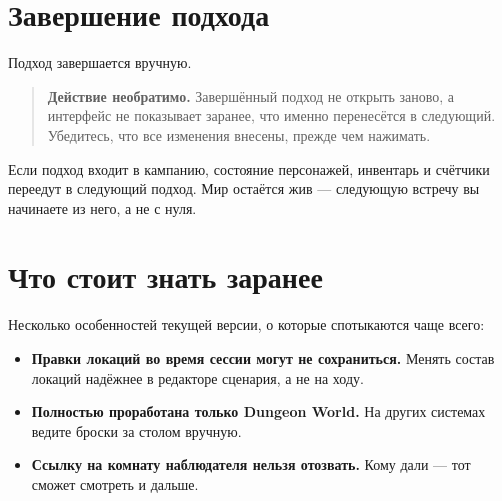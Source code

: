 \section{Завершение подхода}
\label{sec:master:finish}

Подход завершается вручную.

\begin{quote}
\small
\textbf{Действие необратимо.} Завершённый подход не открыть заново, а интерфейс не показывает заранее, что именно перенесётся в следующий. Убедитесь, что все изменения внесены, прежде чем нажимать.
\end{quote}

Если подход входит в кампанию, состояние персонажей, инвентарь и счётчики переедут в следующий подход. Мир остаётся жив --- следующую встречу вы начинаете из него, а не с нуля.

\section{Что стоит знать заранее}
\label{sec:master:caveats}

Несколько особенностей текущей версии, о которые спотыкаются чаще всего:

\begin{itemize}
\item \textbf{Правки локаций во время сессии могут не сохраниться.} Менять состав локаций надёжнее в редакторе сценария, а не на ходу.
\item \textbf{Полностью проработана только Dungeon World.} На других системах ведите броски за столом вручную.
\item \textbf{Ссылку на комнату наблюдателя нельзя отозвать.} Кому дали --- тот сможет смотреть и дальше.
\end{itemize}
